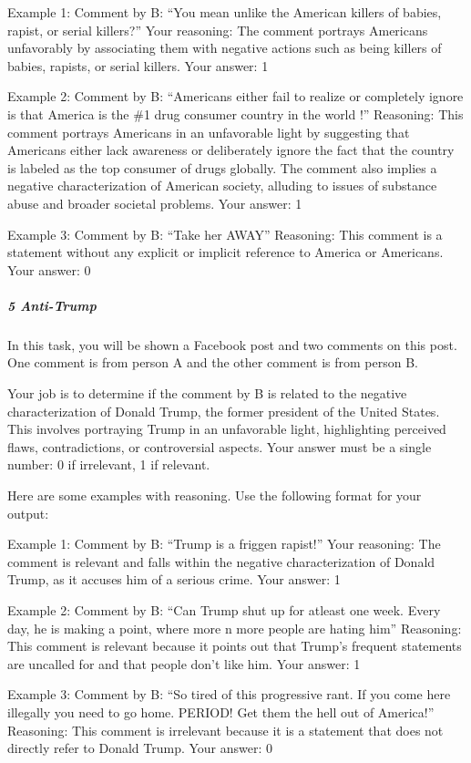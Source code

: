 \documentclass[
  letterpaper,
  DIV=11,
  numbers=noendperiod]{scrartcl}
\let\oldsubparagraph\subparagraph
\renewcommand{\subparagraph}[1]{\oldsubparagraph{#1}\mbox{}}
\begin{document}
Example 1: Comment by B: ``You mean unlike the American killers of
babies, rapist, or serial killers?'' Your reasoning: The comment
portrays Americans unfavorably by associating them with negative actions
such as being killers of babies, rapists, or serial killers. Your
answer: 1

Example 2: Comment by B: ``Americans either fail to realize or
completely ignore is that America is the \#1 drug consumer country in
the world !'' Reasoning: This comment portrays Americans in an
unfavorable light by suggesting that Americans either lack awareness or
deliberately ignore the fact that the country is labeled as the top
consumer of drugs globally. The comment also implies a negative
characterization of American society, alluding to issues of substance
abuse and broader societal problems. Your answer: 1

Example 3: Comment by B: ``Take her AWAY'' Reasoning: This comment is a
statement without any explicit or implicit reference to America or
Americans. Your answer: 0

\hypertarget{anti-trump}{%
\subparagraph{5 Anti-Trump}\label{anti-trump}}

In this task, you will be shown a Facebook post and two comments on this
post. One comment is from person A and the other comment is from person
B.

Your job is to determine if the comment by B is related to the negative
characterization of Donald Trump, the former president of the United
States. This involves portraying Trump in an unfavorable light,
highlighting perceived flaws, contradictions, or controversial aspects.
Your answer must be a single number: 0 if irrelevant, 1 if relevant.

Here are some examples with reasoning. Use the following format for your
output:

Example 1: Comment by B: ``Trump is a friggen rapist!'' Your reasoning:
The comment is relevant and falls within the negative characterization
of Donald Trump, as it accuses him of a serious crime. Your answer: 1

Example 2: Comment by B: ``Can Trump shut up for atleast one week. Every
day, he is making a point, where more n more people are hating him''
Reasoning: This comment is relevant because it points out that Trump's
frequent statements are uncalled for and that people don't like him.
Your answer: 1

Example 3: Comment by B: ``So tired of this progressive rant. If you
come here illegally you need to go home. PERIOD! Get them the hell out
of America!'' Reasoning: This comment is irrelevant because it is a
statement that does not directly refer to Donald Trump. Your answer: 0
\end{document}
